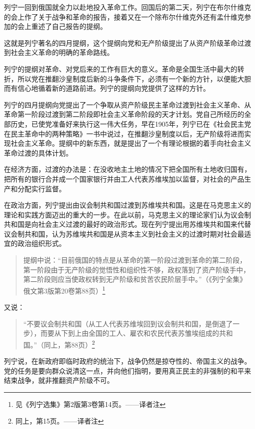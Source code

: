 列宁一回到俄国就全力以赴地投入革命工作。回国后的第二天，列宁在布尔什维克的会上作了关于战争和革命的报告，接着又在一个除布尔什维克外还有孟什维克参加的会上重述了自己报告的提纲。

这就是列宁著名的四月提纲，这个提纲向党和无产阶级提出了从资产阶级革命过渡到社会主义革命的明确的革命路线。

列宁的提纲对革命、对党后来的工作有巨大的意义。革命是全国生活中最大的转折，所以党在推翻沙皇制度后新的斗争条件下，必须有一个新的方针，以便能大胆而有信心地循着新的道路前进。列宁的提纲向党提供了这样的方针。

列宁的四月提纲向党提出了一个争取从资产阶级民主革命过渡到社会主义革命、从革命第一阶段过渡到第二阶段即社会主义革命阶段的天才计划。党自己所经历的全部历史，已使党准备好来执行这一伟大任务，早在1905年，列宁已在《社会民主党在民主革命中的两种策略》一书中说过，在推翻沙皇制度以后，无产阶级将进而实现社会主义革命。提纲中的新东西，就是提出了一个有理论根据的着手向社会主义革命过渡的具体计划。

在经济方面，过渡的办法是：在没收地主土地的情况下把全国所有土地收归国有，把所有的银行合并成一个国家银行并由工人代表苏维埃加以监督，对社会的产品生产和分配实行监督。

在政治方面，列宁提出由议会制共和国过渡到苏维埃共和国。这是在马克思主义的理论和实践方面迈出的重大的一步。在此以前，马克思主义的理论家们认为议会制共和国是向社会主义过渡的最好的政治形式。现在列宁提出用苏维埃共和国来代替议会制共和国，认为苏维埃共和国是从资本主义到社会主义的过渡时期对社会最适宜的政治组织形式。

\begin{quotation}
提纲中说：“目前俄国的特点是从革命的第一阶段过渡到革命的第二阶段，第一阶段由于无产阶级的觉悟性和组织性不够，政权落到了资产阶级手中，第二阶段则应当使政权转到无产阶级和贫苦农民阶层手中。”（《列宁全集》俄文第3版第20卷第88页）\footnote{见《列宁选集》第2版第3卷第14页。——译者注}
\end{quotation}

又说：

\begin{quotation}
“不要议会制共和国（从工人代表苏维埃回到议会制共和国，是倒退了一步），而要从下到上由全国的工人、雇农和农民代表苏雏埃组成的共和国。”（同上，第88页）\footnote{同上，第15页。——译者注}
\end{quotation}

列宁说，在新政府即临时政府的统治下，战争仍然是掠夺性的、帝国主义的战争。党的任务是要向群众说清这一点，并向他们指明，要用真正民主的非强制的和平来结束战争，就非推翻资产阶级不可。

